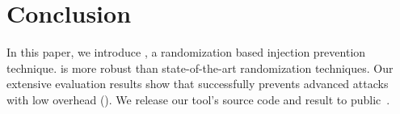 \section{Conclusion}
\label{sec:conclusion}
\vspace{-0.5em}
In this paper, we introduce \sysname, a randomization based  injection prevention technique. \sysname is more robust than state-of-the-art randomization techniques.
Our extensive evaluation results show that \sysname successfully prevents advanced attacks with low overhead ().  We release our tool's source code and result to public~\cite{csr-tool}.